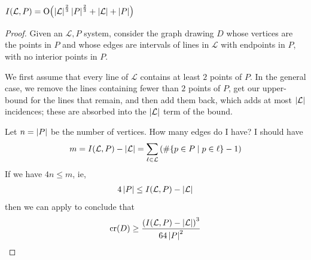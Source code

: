 \begin{boxtheorem} \label{Ch7:Thm:Szemeredi_Trotter}
    $I\!\left( \mathcal{L}, P \right) = \operatorname{O}\!\left( \left\lvert \mathcal{L} \right\rvert^{\frac{2}{3}} \left\lvert P \right\rvert^{\frac{2}{3}} + \left\lvert \mathcal{L} \right\rvert + \left\lvert P \right\rvert \right)$
\end{boxtheorem}
\begin{proof}
    Given an $\mathcal{L},P$ system, consider the graph drawing $D$ whose vertices are the points in $P$ and whose edges are intervals of lines in $\mathcal{L}$ with endpoints in $P$, with no interior points in $P$.

    We first assume that every line of $\mathcal{L}$ contains at least $2$ points of $P$. In the general case, we remove the lines containing fewer than $2$ points of $P$, get our upper-bound for the lines that remain, and then add them back, which adds at most $\left\lvert \mathcal{L} \right\rvert$ incidences; these are absorbed into the $\left\lvert \mathcal{L} \right\rvert$ term of the bound.

    Let $n = \left\lvert P \right\rvert$ be the number of vertices. How many edges do I have? I should have
    \begin{align*}
        m
        = I\!\left( \mathcal{L}, P \right) - \left\lvert \mathcal{L} \right\rvert
        = \sum_{\ell \in \mathcal{L}} \left( \#\!\left\{ p \in P \; \middle\vert \; p \in \ell \right\} - 1 \right)
    \end{align*}
    If we have $4n \leq m$, ie,
    \begin{align*}
        4\left\lvert P \right\rvert \leq I\!\left( \mathcal{L}, P \right) - \left\lvert \mathcal{L} \right\rvert
    \end{align*}
    then we can apply  to conclude that
    \begin{align*}
        \operatorname{cr}\!\left( D \right) \geq \frac{\left( I\!\left( \mathcal{L}, P \right) - \left\lvert \mathcal{L} \right\rvert \right)^3}{64 \left\lvert P \right\rvert^2}
    \end{align*}
    \sorry
\end{proof}

